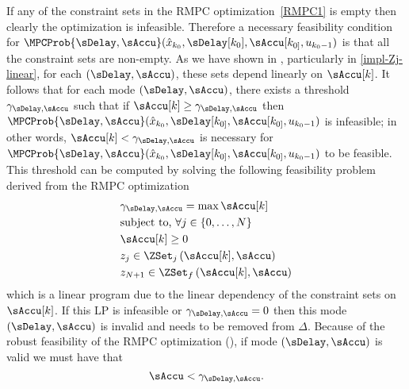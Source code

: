 
If any of the constraint sets in the RMPC optimization~\eqref{RMPC1}
is empty then clearly the optimization is infeasible. Therefore a
necessary feasibility condition for $\MPCProb{\sDelay,\sAccu}(\hat{x}_{k_{0}},\sDelay[k_{0}],\sAccu[k_{0]},u_{k_{0}-1})$
is that all the constraint sets are non-empty. As we have shown in
, particularly in \eqref{impl-Zj-linear},
for each $\left(\sDelay,\sAccu\right)$, these sets depend linearly
on $\sAccu[k]$. It follows that for each mode $\left(\sDelay,\sAccu\right)$,
there exists a threshold $\gamma_{\sDelay,\sAccu}$ such that if $\sAccu[k]\geq\gamma_{\sDelay,\sAccu}$
then $\MPCProb{\sDelay,\sAccu}(\hat{x}_{k_{0}},\sDelay[k_{0]},\sAccu[k_{0]},u_{k_{0}-1})$
is infeasible; in other words, $\sAccu[k]<\gamma_{\sDelay,\sAccu}$
is necessary for $\MPCProb{\sDelay,\sAccu}(\hat{x}_{k_{0}},\sDelay[k_{0]},\sAccu[k_{0]},u_{k_{0}-1})$
to be feasible. This threshold can be computed by solving the following
feasibility problem derived from the RMPC optimization
\begin{align*}
 & \gamma_{\sDelay,\sAccu}=\max\sAccu[k]\\
 & \text{subject to, }\forall j\in\left\{ 0,\dots,N\right\} \\
 & \sAccu[k]\geq0\\
 & z_{j}\in\ZSet_{j}\left(\sAccu[k],\sAccu\right)\\
 & z_{N+1}\in\ZSet_{f}\left(\sAccu[k],\sAccu\right)
\end{align*}
 which is a linear program due to the linear dependency of the constraint
sets on $\sAccu[k]$. If this LP is infeasible or $\gamma_{\sDelay,\sAccu}=0$
then this mode $\left(\sDelay,\sAccu\right)$ is invalid and needs
to be removed from $\Delta$. Because of the robust feasibility of
the RMPC optimization (), if mode $\left(\sDelay,\sAccu\right)$
is valid we must have that 
\begin{equation}
\sAccu<\gamma_{\sDelay,\sAccu}\text{.}\label{eq:necessary-threshold-self-loop}
\end{equation}
 


